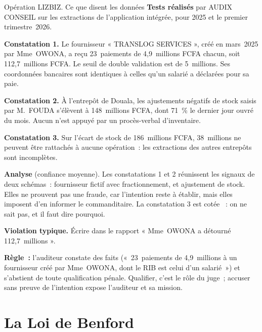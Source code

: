 \begin{boxscenario}{Opération LIZBIZ. Ce que disent les données}
\textbf{Tests réalisés} par AUDIX CONSEIL sur les extractions de l'application
intégrée, pour 2025 et le premier trimestre~2026.

\medskip
\textbf{Constatation 1.} Le fournisseur « TRANSLOG SERVICES », créé en
mars~2025 par Mme~OWONA, a reçu 23~paiements de 4,9~millions FCFA chacun,
soit 112,7~millions FCFA. Le seuil de double validation est de 5~millions.
Ses coordonnées bancaires sont identiques à celles qu'un salarié a déclarées
pour sa paie.

\medskip
\textbf{Constatation 2.} À l'entrepôt de Douala, les ajustements négatifs de
stock saisis par M.~FOUDA s'élèvent à 148~millions FCFA, dont 71~\% le
dernier jour ouvré du mois. Aucun n'est appuyé par un procès-verbal
d'inventaire.

\medskip
\textbf{Constatation 3.} Sur l'écart de stock de 186~millions FCFA, 38~millions
ne peuvent être rattachés à aucune opération~: les extractions des autres
entrepôts sont incomplètes.

\medskip
\textbf{Analyse} (confiance moyenne). Les constatations 1 et 2 réunissent
les signaux de deux schémas~: fournisseur fictif avec fractionnement, et
ajustement de stock. Elles ne prouvent pas une fraude, car l'intention reste
à établir, mais elles imposent d'en informer le commanditaire. La
constatation 3 est cotée \NEK{}~: on ne sait pas, et il faut dire pourquoi.
\end{boxscenario}

\begin{boxalert}
\textbf{Violation typique.} Écrire dans le rapport « Mme~OWONA a détourné
112,7~millions ».

\smallskip
\textbf{Règle~:} l'auditeur constate des faits («~23~paiements de
4,9~millions à un fournisseur créé par Mme~OWONA, dont le RIB est celui
d'un salarié~») et s'abstient de toute qualification pénale. Qualifier,
c'est le rôle du juge~; accuser sans preuve de l'intention expose
l'auditeur et sa mission.
\end{boxalert}

\section{La Loi de Benford}
\label{sec:c06-benford}

